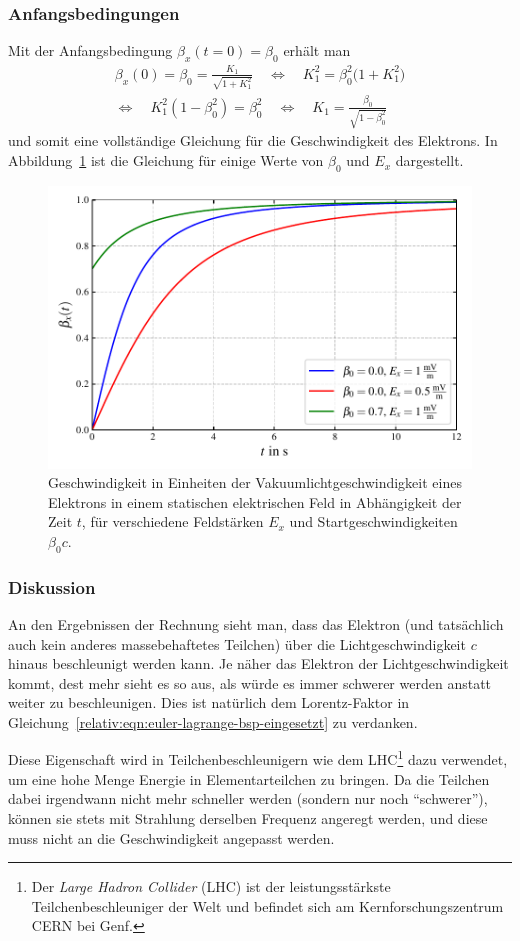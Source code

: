 \subsubsection{Anfangsbedingungen}
Mit der Anfangsbedingung \(\beta_x(t=0)=\beta_0\) erhält man
\begin{multline*}
    \beta_x(0) = \beta_0 = \frac{K_1}{\sqrt{1+K_1^2}}\quad
    \Leftrightarrow\quad K_1^2 = \beta_0^2 \bigl(1+K_1^2\bigr)\\
    \Leftrightarrow\quad K_1^2 (1-\beta_0^2 ) = \beta_0^2 \quad
    \Leftrightarrow\quad K_1 = \frac{\beta_0}{\sqrt{1-\beta_0^2 }}
\end{multline*}
und somit eine vollständige Gleichung für die Geschwindigkeit des Elektrons.
In Abbildung~\ref{relativ:fig:elektron-em-feld} ist die Gleichung für einige
Werte von \(\beta_0\) und \(E_x\) dargestellt.
\begin{figure}
    \centering
    \includegraphics[width=0.8\linewidth]{papers/relativ/images/elektron_e-feld.pdf}
    \caption{Geschwindigkeit in Einheiten der Vakuumlichtgeschwindigkeit
    eines Elektrons in einem statischen elektrischen Feld in Abhängigkeit der Zeit \(t\),
    für verschiedene Feldstärken \(E_x\) und Startgeschwindigkeiten \(\beta_0 c\).
    \label{relativ:fig:elektron-em-feld}}
\end{figure}

\subsubsection{Diskussion}
An den Ergebnissen der Rechnung sieht man, dass das Elektron (und tatsächlich auch kein anderes
massebehaftetes Teilchen) über die Lichtgeschwindigkeit \(c\) hinaus beschleunigt werden kann.
Je näher das Elektron der Lichtgeschwindigkeit kommt, dest mehr sieht es so aus,
als würde es immer schwerer werden anstatt weiter zu beschleunigen.
Dies ist natürlich dem Lorentz-Faktor in Gleichung~\eqref{relativ:eqn:euler-lagrange-bsp-eingesetzt}
zu verdanken.

Diese Eigenschaft wird in Teilchenbeschleunigern wie dem LHC\footnote{
Der \emph{Large Hadron Collider} (LHC) ist der leistungsstärkste
Teilchenbeschleuniger der Welt und befindet sich am
Kernforschungszentrum CERN bei Genf.
}
dazu verwendet, um eine hohe Menge Energie in Elementarteilchen zu bringen.
Da die Teilchen dabei irgendwann nicht mehr schneller werden
(sondern nur noch ``schwerer''),
können sie stets mit Strahlung derselben Frequenz angeregt werden, und
diese muss nicht an die Geschwindigkeit angepasst werden.
